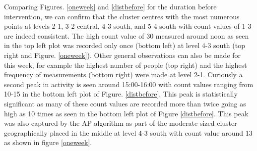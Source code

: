 Comparing Figures. \ref{oneweek} and \ref{distbefore} for the duration before intervention, we can confirm that the cluster centres with the most numerous points at levels 2-1, 3-2 central, 4-3 south, and 5-4 south with count values of 1-3 are indeed consistent. The high count value of 30 measured around noon as seen in the top left plot was recorded only once (bottom left) at level 4-3 south (top right and Figure. \ref{oneweek}). Other general observations can also be made for this week, for example the highest number of people (top right) and the highest frequency of measurements (bottom right) were made at level 2-1. Curiously a second peak in activity is seen around 15:00-16:00 with count values ranging from 10-15 in the bottom left plot of Figure. \ref{distbefore}. This peak is statistically significant as many of these count values are recorded more than twice going as high as 10 times as seen in the bottom left plot of Figure \ref{distbefore}. This peak was also captured by the AP algorithm as part of the moderate sized cluster geographically placed in the middle at level 4-3 south with count value around 13 as shown in figure \ref{oneweek}.




   


